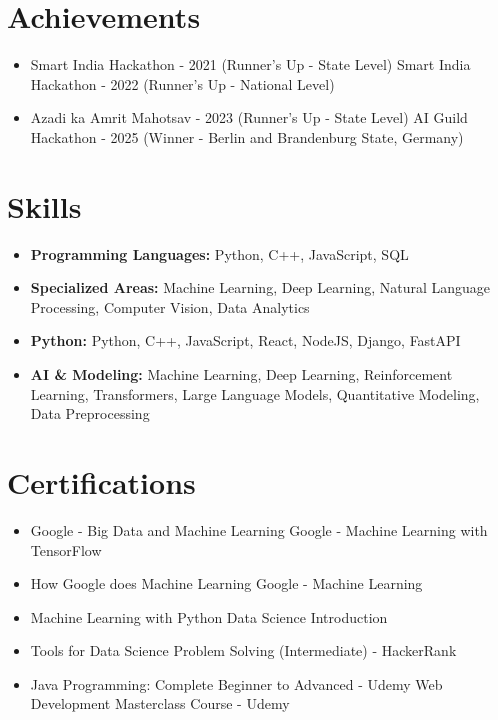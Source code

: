 \documentclass[a4paper,10pt]{article}
\begin{document}
\section*{Achievements}
\begin{itemize}
\item Smart India Hackathon - 2021 (Runner's Up - State Level) \hfill Smart India Hackathon - 2022 (Runner's Up - National Level)
\item Azadi ka Amrit Mahotsav - 2023 (Runner's Up - State Level) \hfill AI Guild Hackathon - 2025 (Winner - Berlin and Brandenburg State, Germany)
\end{itemize}

\section*{Skills}
\begin{itemize}
  \item \textbf{Programming Languages:} Python, C++, JavaScript, SQL
  \item \textbf{Specialized Areas:} Machine Learning, Deep Learning, Natural Language Processing, Computer Vision, Data Analytics
  \item \textbf{Python:} Python, C++, JavaScript, React, NodeJS, Django, FastAPI
  \item \textbf{AI \& Modeling:} Machine Learning, Deep Learning, Reinforcement Learning, Transformers, Large Language Models, Quantitative Modeling, Data Preprocessing
\end{itemize}

\section*{Certifications}
\begin{itemize}
\item Google - Big Data and Machine Learning \hfill Google - Machine Learning with TensorFlow
\item How Google does Machine Learning \hfill Google - Machine Learning
\item Machine Learning with Python \hfill Data Science Introduction
\item Tools for Data Science \hfill Problem Solving (Intermediate) - HackerRank
\item Java Programming: Complete Beginner to Advanced - Udemy \hfill Web Development Masterclass Course - Udemy
\end{itemize}
\end{document}
